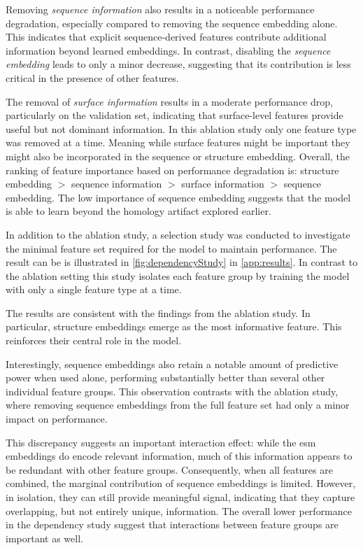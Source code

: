 Removing \textit{sequence information} also results in a noticeable performance degradation, especially compared to removing the sequence embedding alone. This indicates that explicit sequence-derived features contribute additional information beyond learned embeddings. In contrast, disabling the \textit{sequence embedding} leads to only a minor decrease, suggesting that its contribution is less critical in the presence of other features.

The removal of \textit{surface information} results in a moderate performance drop, particularly on the validation set, indicating that surface-level features provide useful but not dominant information. In this ablation study only one feature type was removed at a time. Meaning while surface features might be important they might also be incorporated in the sequence or structure embedding. Overall, the ranking of feature importance based on performance degradation is: structure embedding $>$ sequence information $>$ surface information $>$ sequence embedding. The low importance of sequence embedding suggests that the model is able to learn beyond the homology artifact explored earlier. 

In addition to the ablation study, a selection study was conducted to investigate the minimal feature set required for the model to maintain performance. The result can be is illustrated in \autoref{fig:dependencyStudy} in \autoref{app:results}. In contrast to the ablation setting this study isolates each feature group by training the model with only a single feature type at a time.

The results are consistent with the findings from the ablation study. In particular, structure embeddings emerge as the most informative feature. This reinforces their central role in the model.

Interestingly, sequence embeddings also retain a notable amount of predictive power when used alone, performing substantially better than several other individual feature groups. This observation contrasts with the ablation study, where removing sequence embeddings from the full feature set had only a minor impact on performance.

This discrepancy suggests an important interaction effect:
while the \gls{esm} embeddings do encode relevant information, much of this information appears to be redundant with other feature groups. Consequently, when all features are combined, the marginal contribution of sequence embeddings is limited. However, in isolation, they can still provide meaningful signal, indicating that they capture overlapping, but not entirely unique, information. The overall lower performance in the dependency study suggest that interactions between feature groups are important as well. 

